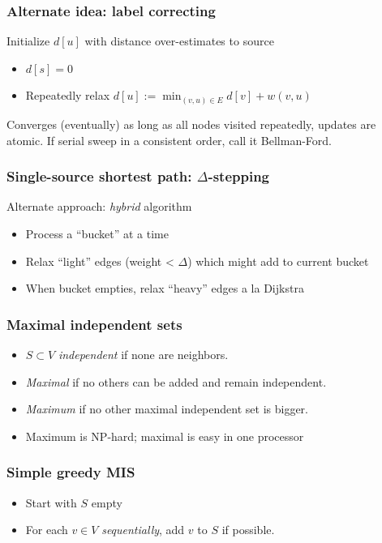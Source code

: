 \documentclass{beamer}
\begin{document}
\begin{frame}
  \frametitle{Alternate idea: label correcting}

  Initialize $d[u]$ with distance over-estimates to source
  \begin{itemize}
  \item $d[s] = 0$
  \item Repeatedly relax $d[u] := \min_{(v,u) \in E} d[v] + w(v,u)$
  \end{itemize}
  Converges (eventually) as long as all nodes visited repeatedly,
  updates are atomic.  If serial sweep in a consistent order, call
  it Bellman-Ford.
  
\end{frame}

\begin{frame}
  \frametitle{Single-source shortest path: $\Delta$-stepping}

  Alternate approach: {\em hybrid} algorithm
  \begin{itemize}
  \item Process a ``bucket'' at a time
  \item Relax ``light'' edges (weight < $\Delta$) which might add to
    current bucket
  \item When bucket empties, relax ``heavy'' edges a la Dijkstra
  \end{itemize}
\end{frame}

\begin{frame}
  \frametitle{Maximal independent sets}

  \begin{itemize}
  \item $S \subset V$ {\em independent} if none are neighbors.
  \item {\em Maximal} if no others can be added and remain
    independent.
  \item {\em Maximum} if no other maximal independent set is bigger.
  \item Maximum is NP-hard; maximal is easy in one processor
  \end{itemize}
\end{frame}


\begin{frame}
  \frametitle{Simple greedy MIS}

  \begin{center}
    \begin{tikzpicture}
      
    \end{tikzpicture}
  \end{center}
  
  \begin{itemize}
  \item Start with $S$ empty
  \item For each $v \in V$ {\em sequentially}, add $v$ to $S$ if possible.
  \end{itemize}

\end{frame}
\end{document}
